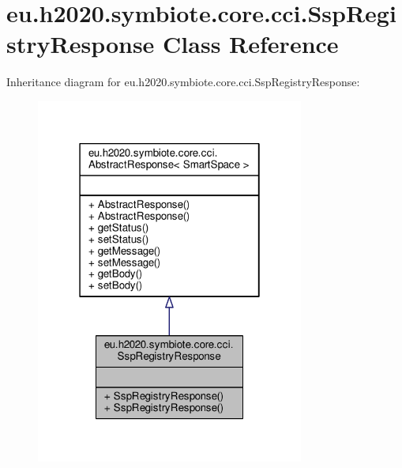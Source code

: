 \hypertarget{classeu_1_1h2020_1_1symbiote_1_1core_1_1cci_1_1SspRegistryResponse}{}\section{eu.\+h2020.\+symbiote.\+core.\+cci.\+Ssp\+Registry\+Response Class Reference}
\label{classeu_1_1h2020_1_1symbiote_1_1core_1_1cci_1_1SspRegistryResponse}


Inheritance diagram for eu.\+h2020.\+symbiote.\+core.\+cci.\+Ssp\+Registry\+Response\+:\nopagebreak
\begin{figure}[H]
\begin{center}
\leavevmode
\includegraphics[width=250pt]{classeu_1_1h2020_1_1symbiote_1_1core_1_1cci_1_1SspRegistryResponse__inherit__graph}
\end{center}
\end{figure}


